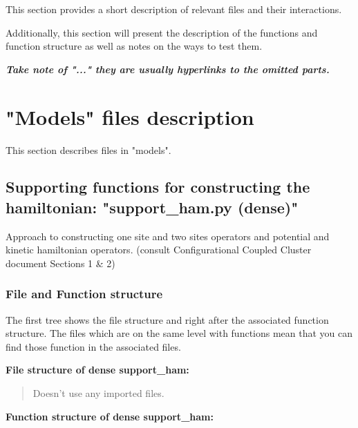 \documentclass[a4paper,10pt]{article}
\begin{document}
This section provides a short description of relevant files and their interactions.

Additionally, this section will present the description of the functions and function structure as well as notes on the ways to test them.

\textbf{\itshape Take note of "..." they are usually hyperlinks to the omitted parts.}





\section{"Models" files description}

This section describes files in "models".




\subsection{Supporting functions for constructing the hamiltonian: "support\_ham.py (dense)"}

Approach to constructing one site and two sites operators and potential and kinetic hamiltonian operators. (consult Configurational Coupled Cluster document Sections 1 \& 2)



\subsubsection{File and Function structure}

The first tree shows the file structure and right after the associated function structure. The files which are on the same level with functions mean that you can find those function in the associated files.


\textbf{\newline File structure of dense support\_ham: \newline}

\begin{quote}
  Doesn't use any imported files.
\end{quote}


\textbf{\newline Function structure of dense support\_ham: \newline}
\end{document}
